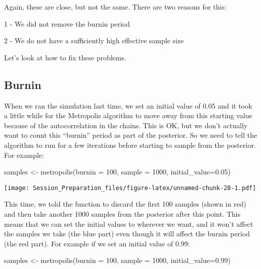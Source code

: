 \documentclass[
  12pt,
]{article}
\newenvironment{Shaded}{\begin{snugshade}}{\end{snugshade}}
\newcommand{\AttributeTok}[1]{\textcolor[rgb]{0.77,0.63,0.00}{#1}}
\newcommand{\DecValTok}[1]{\textcolor[rgb]{0.00,0.00,0.81}{#1}}
\newcommand{\FloatTok}[1]{\textcolor[rgb]{0.00,0.00,0.81}{#1}}
\newcommand{\FunctionTok}[1]{\textcolor[rgb]{0.00,0.00,0.00}{#1}}
\newcommand{\NormalTok}[1]{#1}
\newcommand{\OtherTok}[1]{\textcolor[rgb]{0.56,0.35,0.01}{#1}}
\begin{document}
Again, these are close, but not the same. There are two reasons for
this:

1 - We did not remove the burnin period

2 - We do not have a sufficiently high effective sample size

Let's look at how to fix these problems.

\hypertarget{burnin}{%
\subsection{Burnin}\label{burnin}}

When we ran the simulation last time, we set an initial value of 0.05
and it took a little while for the Metropolis algorithm to move away
from this starting value because of the autocorrelation in the chains.
This is OK, but we don't actually want to count this ``burnin'' period
as part of the posterior. So we need to tell the algorithm to run for a
few iterations before starting to sample from the posterior. For
example:

\begin{Shaded}
\begin{Highlighting}[]
\NormalTok{samples }\OtherTok{\textless{}{-}} \FunctionTok{metropolis}\NormalTok{(}\AttributeTok{burnin =} \DecValTok{100}\NormalTok{, }\AttributeTok{sample =} \DecValTok{1000}\NormalTok{, }\AttributeTok{initial\_value=}\FloatTok{0.05}\NormalTok{)}
\end{Highlighting}
\end{Shaded}

\texttt{[image: Session\_Preparation\_files/figure-latex/unnamed-chunk-28-1.pdf]}

This time, we told the function to discard the first 100 samples (shown
in red) and then take another 1000 samples from the posterior after this
point. This means that we can set the initial values to wherever we
want, and it won't affect the samples we take (the blue part) even
though it will affect the burnin period (the red part). For example if
we set an initial value of 0.99:

\begin{Shaded}
\begin{Highlighting}[]
\NormalTok{samples }\OtherTok{\textless{}{-}} \FunctionTok{metropolis}\NormalTok{(}\AttributeTok{burnin =} \DecValTok{100}\NormalTok{, }\AttributeTok{sample =} \DecValTok{1000}\NormalTok{, }\AttributeTok{initial\_value=}\FloatTok{0.99}\NormalTok{)}
\end{Highlighting}
\end{Shaded}
\end{document}

